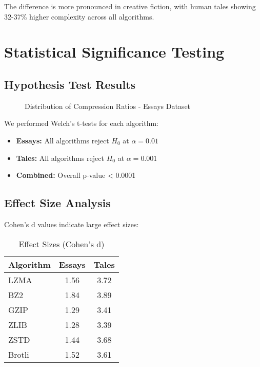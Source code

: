 \documentclass[12pt,a4paper]{report}
\begin{document}
The difference is more pronounced in creative fiction, with human tales showing 32-37\% higher complexity across all algorithms.

\section{Statistical Significance Testing}

\subsection{Hypothesis Test Results}

\begin{figure}[h]
\centering
\caption{Distribution of Compression Ratios - Essays Dataset}
\label{fig:essay_distribution}
\end{figure}

We performed Welch's t-tests for each algorithm:

\begin{itemize}
    \item \textbf{Essays:} All algorithms reject $H_0$ at $\alpha = 0.01$
    \item \textbf{Tales:} All algorithms reject $H_0$ at $\alpha = 0.001$
    \item \textbf{Combined:} Overall p-value < 0.0001
\end{itemize}

\subsection{Effect Size Analysis}

Cohen's d values indicate large effect sizes:

\begin{table}[h]
\centering
\caption{Effect Sizes (Cohen's d)}
\begin{tabular}{lcc}
\toprule
\textbf{Algorithm} & \textbf{Essays} & \textbf{Tales} \\
\midrule
LZMA & 1.56 & 3.72 \\
BZ2 & 1.84 & 3.89 \\
GZIP & 1.29 & 3.41 \\
ZLIB & 1.28 & 3.39 \\
ZSTD & 1.44 & 3.68 \\
Brotli & 1.52 & 3.61 \\
\bottomrule
\end{tabular}
\end{table}
\end{document}
